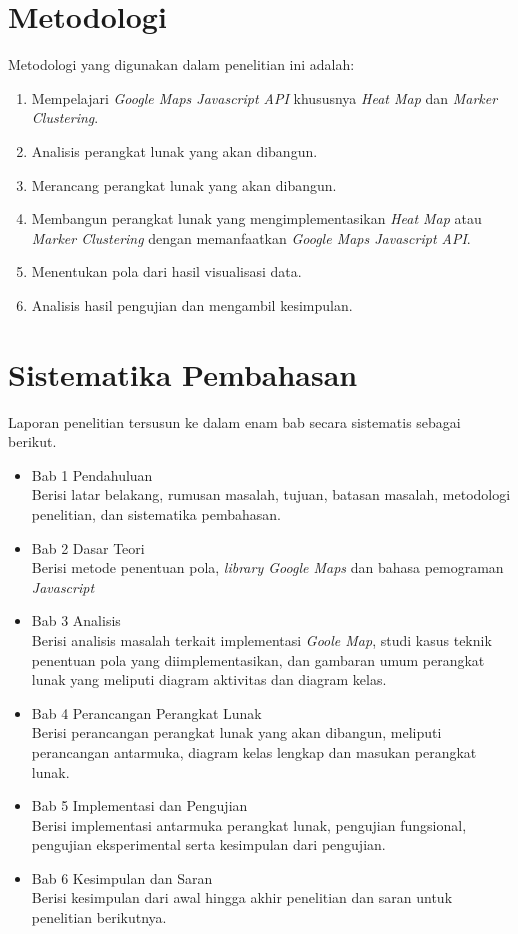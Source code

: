 \section{Metodologi}
\label{sec:metlit}
Metodologi yang digunakan dalam penelitian ini adalah:
	\begin{enumerate}
		\item Mempelajari \textit{Google Maps Javascript API} khususnya \textit{Heat Map} dan \textit{Marker Clustering}.
		\item Analisis  perangkat lunak yang akan dibangun.
		\item Merancang perangkat lunak yang akan dibangun.
		\item Membangun perangkat lunak yang mengimplementasikan \textit{Heat Map} atau \textit{Marker Clustering} dengan memanfaatkan \textit{Google Maps Javascript API}.
		\item Menentukan pola dari hasil visualisasi data.
		\item Analisis hasil pengujian dan mengambil kesimpulan.
	\end{enumerate}


\section{Sistematika Pembahasan}
\label{sec:sispem}
Laporan penelitian tersusun ke dalam enam bab secara sistematis sebagai berikut.
\begin{itemize}
    \item Bab 1 Pendahuluan\\
    Berisi latar belakang, rumusan masalah, tujuan, batasan masalah, metodologi penelitian, dan sistematika pembahasan.
   
   \item Bab 2 Dasar Teori\\
    Berisi  metode penentuan pola, \textit{library Google Maps} dan bahasa pemograman \textit{Javascript}
   
    \item Bab 3 Analisis\\
    Berisi analisis masalah terkait implementasi \textit{Goole Map}, studi kasus teknik penentuan pola yang diimplementasikan, dan gambaran umum perangkat lunak yang meliputi diagram aktivitas dan diagram kelas.
  
    \item Bab 4 Perancangan Perangkat Lunak\\
    Berisi perancangan perangkat lunak yang akan dibangun, meliputi perancangan antarmuka,
diagram kelas lengkap dan masukan perangkat lunak.
    
    \item Bab 5 Implementasi dan Pengujian\\
Berisi implementasi antarmuka perangkat lunak, pengujian fungsional, pengujian eksperimental
serta kesimpulan dari pengujian.
   
    \item Bab 6 Kesimpulan dan Saran\\
    Berisi kesimpulan dari awal hingga akhir penelitian dan saran untuk penelitian berikutnya.
\end{itemize}
